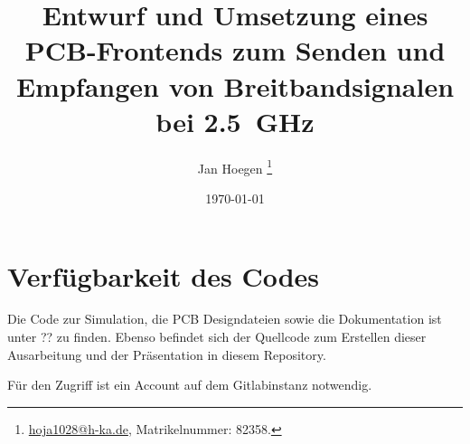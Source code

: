 \documentclass[
    paper=a4,
    fontsize=11pt,
    DIV=10,
    fleqn, 
    headsepline=true,
    headinclude=true, %
]{scrreport}
\title{Entwurf und Umsetzung eines PCB-Frontends zum Senden und Empfangen von Breitbandsignalen bei \qty{2.5}{\giga\hertz}}
\author{Jan Hoegen%
    \thanks{\href{mailto:hoja1028@h-ka.de}{hoja1028@h-ka.de}, Matrikelnummer: 82358.}
}
\date{\today}
\begin{document}
\maketitle

\tableofcontents



% 









\appendix   %

\printbibliography[]

\chapter{Verfügbarkeit des Codes}
    Die Code zur Simulation, die PCB Designdateien sowie die Dokumentation ist unter
    ?? %
    zu finden.
    Ebenso befindet sich der Quellcode zum Erstellen dieser Ausarbeitung und der Präsentation in diesem Repository.

    Für den Zugriff ist ein Account auf dem Gitlabinstanz notwendig.




\end{document}
